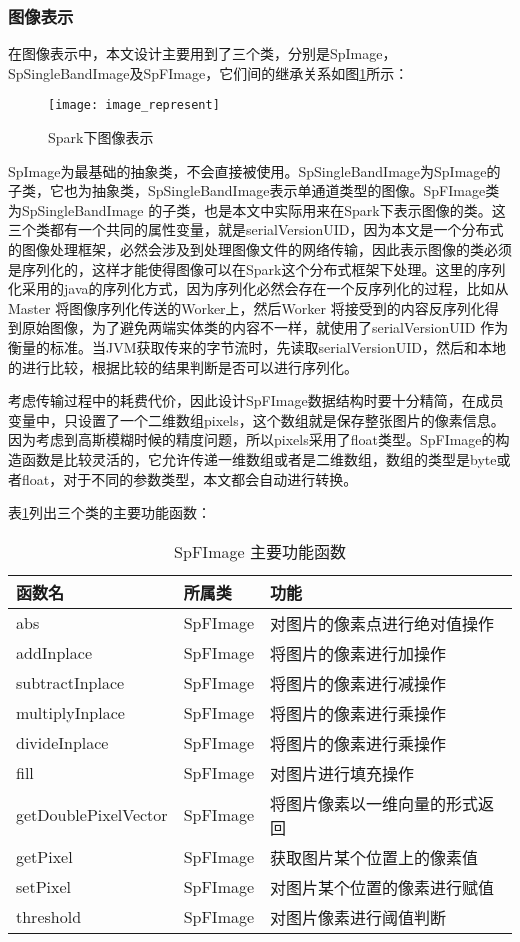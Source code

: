\subsubsection{图像表示}
在图像表示中，本文设计主要用到了三个类，分别是SpImage，SpSingleBandImage及SpFImage，它们间的继承关系如图\ref{fig:image_represent}所示：
\begin{figure}[htp]
\centering
\texttt{[image: image\_represent]}
\caption{Spark下图像表示}
\label{fig:image_represent}
\end{figure}
SpImage为最基础的抽象类，不会直接被使用。SpSingleBandImage为SpImage的子类，它也为抽象类，SpSingleBandImage表示单通道类型的图像。SpFImage类为SpSingleBandImage 的子类，也是本文中实际用来在Spark下表示图像的类。这三个类都有一个共同的属性变量，就是serialVersionUID，因为本文是一个分布式的图像处理框架，必然会涉及到处理图像文件的网络传输，因此表示图像的类必须是序列化的，这样才能使得图像可以在Spark这个分布式框架下处理。这里的序列化采用的java的序列化方式，因为序列化必然会存在一个反序列化的过程，比如从Master 将图像序列化传送的Worker上，然后Worker 将接受到的内容反序列化得到原始图像，为了避免两端实体类的内容不一样，就使用了serialVersionUID 作为衡量的标准。当JVM获取传来的字节流时，先读取serialVersionUID，然后和本地的进行比较，根据比较的结果判断是否可以进行序列化。

考虑传输过程中的耗费代价，因此设计SpFImage数据结构时要十分精简，在成员变量中，只设置了一个二维数组pixels，这个数组就是保存整张图片的像素信息。因为考虑到高斯模糊时候的精度问题，所以pixels采用了float类型。SpFImage的构造函数是比较灵活的，它允许传递一维数组或者是二维数组，数组的类型是byte或者float，对于不同的参数类型，本文都会自动进行转换。

表\ref{tab:SpFImage_function}列出三个类的主要功能函数：
\begin{table}[h] %
\caption{SpFImage 主要功能函数} %
\centering
\label{tab:SpFImage_function}
\begin{tabular}{p{4cm}|p{2cm}|p{6cm}} %
\hline
\hline
函数名  & 所属类 & 功能 \\ %
\hline %
abs  & SpFImage & 对图片的像素点进行绝对值操作\\
\hline
addInplace  & SpFImage & 将图片的像素进行加操作\\
\hline
subtractInplace  & SpFImage & 将图片的像素进行减操作\\
\hline
multiplyInplace  & SpFImage & 将图片的像素进行乘操作\\
\hline
divideInplace  & SpFImage & 将图片的像素进行乘操作\\
\hline
fill  & SpFImage & 对图片进行填充操作\\
\hline
getDoublePixelVector & SpFImage & 将图片像素以一维向量的形式返回\\
\hline
getPixel& SpFImage & 获取图片某个位置上的像素值\\
\hline
setPixel & SpFImage & 对图片某个位置的像素进行赋值\\
\hline
threshold & SpFImage & 对图片像素进行阈值判断\\
\hline
\hline
\end{tabular}
\end{table}
